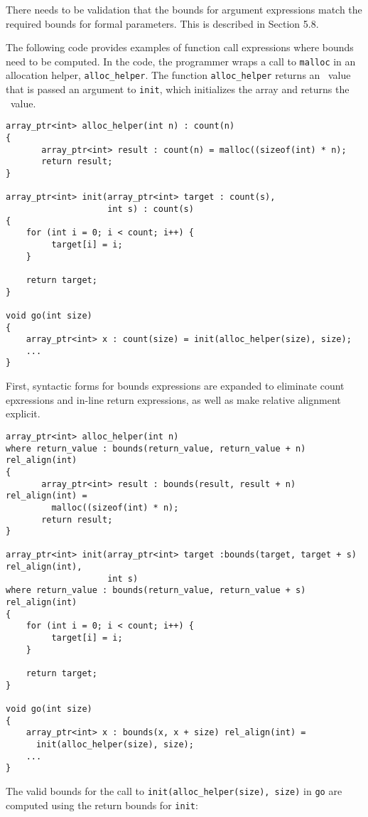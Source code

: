 There needs to be validation that the bounds for argument expressions
match the required bounds for formal parameters. This is described in
Section 5.8.

The following code provides examples of function call expressions where
bounds need to be computed. In the code, the programmer wraps a call to
\texttt{malloc} in an allocation helper, \texttt{alloc\_helper}. The
function \texttt{alloc\_helper} returns an \arrayptr\ value
that is passed an argument to \texttt{init}, which initializes the array
and returns the \arrayptr\ value.
\begin{verbatim}
array_ptr<int> alloc_helper(int n) : count(n)
{
       array_ptr<int> result : count(n) = malloc((sizeof(int) * n);
       return result;
}

array_ptr<int> init(array_ptr<int> target : count(s), 
                    int s) : count(s)
{
    for (int i = 0; i < count; i++) {
         target[i] = i;
    }

    return target;
}

void go(int size) 
{
    array_ptr<int> x : count(size) = init(alloc_helper(size), size);
    ...
}
\end{verbatim}

First, syntactic forms for bounds expressions are expanded to eliminate
count epxressions and in-line return expressions, as well as make
relative alignment explicit.

\begin{verbatim}
array_ptr<int> alloc_helper(int n)
where return_value : bounds(return_value, return_value + n) rel_align(int)
{
       array_ptr<int> result : bounds(result, result + n) rel_align(int) =
         malloc((sizeof(int) * n);
       return result;
}

array_ptr<int> init(array_ptr<int> target :bounds(target, target + s) rel_align(int), 
                    int s) 
where return_value : bounds(return_value, return_value + s) rel_align(int)
{
    for (int i = 0; i < count; i++) {
         target[i] = i;
    }

    return target;
}

void go(int size) 
{
    array_ptr<int> x : bounds(x, x + size) rel_align(int) = 
      init(alloc_helper(size), size);
    ...
}
\end{verbatim}

The valid bounds for the call to \texttt{init(alloc\_helper(size),
size)} in \texttt{go} are computed using the return bounds for
\texttt{init}:


